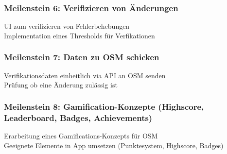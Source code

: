 \subsubsection{Meilenstein 6: Verifizieren von Änderungen}

\tick UI zum verifizieren von Fehlerbehebungen \\
\tick Implementation eines Thresholds für Verfikationen

\subsubsection{Meilenstein 7: Daten zu OSM schicken}

\cross Verifikationsdaten einheitlich via API an OSM senden \\
\cross Prüfung ob eine Änderung zulässig ist

\subsubsection{Meilenstein 8: Gamification-Konzepte (Highscore, Leaderboard, Badges, Achievements)}

\tick Erarbeitung eines Gamifications-Konzepts für OSM \\
\tick Geeignete Elemente in App umsetzen (Punktesystem, Highscore, Badges)